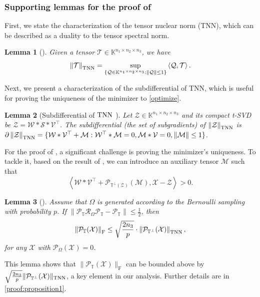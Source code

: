 \documentclass[twoside,12pt]{article}
\newtheorem{lemma}{Lemma}
\newcommand{\TNN}{\textnormal{TNN}}
\def\fro{{\mathrm{F}}}
\def\fro{{\mathrm{F}}}
\begin{document}
\subsubsection{\textnormal{Supporting lemmas for the proof of }}
First, we state the characterization of the tensor nuclear norm (TNN), which can be described as  a duality to the tensor spectral norm.
\begin{lemma}[\cite{Lu18}]\label{dual_tnn}
 Given a tensor $\mathcal{T}\in \mathbb{K}^{n_{1}\times n_{2}\times n_{3}}$, we have $$
 \left\|\mathcal{T}\right\|_{\TNN} = \sup\limits_{\{ \mathcal{Q}\in \mathbb{K}^{n_{1}\times n_{2}\times n_{3}}:\left\|\mathcal{Q}\right\|\leq 1\}} \left\langle \mathcal{Q},\mathcal{T}\right\rangle.$$
\end{lemma}
 {Next, we present a characterization of the subdifferential of TNN,  which is useful for proving the uniqueness of the minimizer to  \eqref{optimize}.}
\begin{lemma}[Subdifferential of $\TNN$ \citep{Lu18}]  \label{subdifferential}
Let $\mathcal{Z}\in \mathbb{K}^{n_{1}\times n_{2}\times n_{3}}$ and its compact t-SVD be $\mathcal{Z} = \mathcal{W}*\mathcal{S}*\mathcal{V}^{\top}$. The subdifferential (the set of subgradients) of $\left\|\mathcal{Z}\right\|_{\TNN}$ is $\partial\left\|\mathcal{Z}\right\|_{\TNN} = \{\mathcal{W}*\mathcal{V}^{\top}+\mathcal{M}: \mathcal{W}^{\top}*\mathcal{M}=0, \mathcal{M}*\mathcal{V}=0,\left\|\mathcal{M}\right\|\leq 1\}$.
\end{lemma}
For the proof of  , a significant challenge is proving the minimizer's uniqueness. To tackle it, based on the result of , we can introduce an auxiliary tensor $\mathcal{M}$ such that \[\left\langle \mathcal{W}*\mathcal{V}^{\top}+\mathcal{P}_{\mathbb{T}^{\perp}(\mathcal{Z})}(\mathcal{M}), \mathcal{X}-\mathcal{Z}\right\rangle>0. \] 
\begin{lemma}[\cite{zhang2017exact}] \label{lemma19}
 Assume that $\Omega$ is generated according to the Bernoulli sampling with probability $p$. If $\left\|\mathcal{P}_{\mathbb{T}}\mathcal{R}_{\Omega}\mathcal{P}_{\mathbb{T}}-\mathcal{P}_{\mathbb{T}}\right\|\leq \frac{1}{2}$, then   
$$
\left\|\mathcal{P}_{\mathbb{T}}(\mathcal{X})\right\|_{\fro}\leq \sqrt{\frac{2n_{3}}{p}} \cdot \left\|\mathcal{P}_{\mathbb{T}^{\perp}}(\mathcal{X})\right\|_{\TNN},
$$
for any $\mathcal{X}$ with $\mathcal{P}_{\Omega}(\mathcal{X}) = 0$.
\end{lemma}
This lemma shows that  \(\|\mathcal{P}_{\mathbb{T}}(\mathcal{X})\|_{\fro}\) can be bounded above by \(\sqrt{\frac{2n_3}{p}}\|\mathcal{P}_{\mathbb{T}^{\perp}}(\mathcal{X})\|_{\TNN}\), a key element in our analysis. Further details are in \ref{proof:proposition1}.
\vspace{-5pt}
\end{document}
